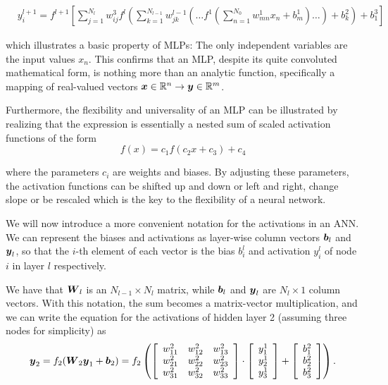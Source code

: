 \begin{align}\label{eq:complete-nn}
&y^{l+1}_i = f^{l+1}\left[\!\sum_{j=1}^{N_l} w_{ij}^3 f^l\left(\sum_{k=1}^{N_{l-1}}w_{jk}^{l-1}\left(\dots f^1\left(\sum_{n=1}^{N_0} w_{mn}^1 x_n+ b_m^1\right)\dots\right)+b_k^2\right)+b_1^3\right] &&
\end{align}

which illustrates a basic property of MLPs: The only independent
variables are the input values $x_n$.
This confirms that an MLP, despite its quite convoluted
mathematical form, is nothing more than an analytic function, specifically a
mapping of real-valued vectors ${\boldsymbol{x}} \in \mathbb{R}^n \rightarrow
{\boldsymbol{y}} \in \mathbb{R}^m$.

Furthermore, the flexibility and universality of an MLP can be
illustrated by realizing that the expression is essentially a nested
sum of scaled activation functions of the form
\begin{equation}
 f(x) = c_1 f(c_2 x + c_3) + c_4
\end{equation}

where the parameters $c_i$ are weights and biases. By adjusting these
parameters, the activation functions can be shifted up and down or
left and right, change slope or be rescaled which is the key to the
flexibility of a neural network.

We will now introduce a more convenient notation for the activations in an ANN. 
We can represent the biases and activations
as layer-wise column vectors ${\boldsymbol{b}}_l$ and ${\boldsymbol{y}}_l$, so that the $i$-th element of each vector 
is the bias $b_i^l$ and activation $y_i^l$ of node $i$ in layer $l$ respectively. 

We have that ${\boldsymbol{W}}_l$ is an $N_{l-1} \times N_l$ matrix, 
while ${\boldsymbol{b}}_l$ and ${\boldsymbol{y}}_l$ are $N_l \times 1$ column vectors. 
With this notation, the sum becomes a matrix-vector multiplication, and we can write
the equation for the activations of hidden layer 2 (assuming three nodes for simplicity) as
\begin{equation}
 {\boldsymbol{y}}_2 = f_2({\boldsymbol{W}}_2 {\boldsymbol{y}}_{1} + {\boldsymbol{b}}_{2}) = 
 f_2\left(\left[\begin{array}{ccc}
    w^2_{11} &w^2_{12} &w^2_{13} \\
    w^2_{21} &w^2_{22} &w^2_{23} \\
    w^2_{31} &w^2_{32} &w^2_{33} \\
    \end{array} \right] \cdot
    \left[\begin{array}{c}
           y^1_1 \\
           y^1_2 \\
           y^1_3 \\
          \end{array}\right] + 
    \left[\begin{array}{c}
           b^2_1 \\
           b^2_2 \\
           b^2_3 \\
          \end{array}\right]\right).
\end{equation}


